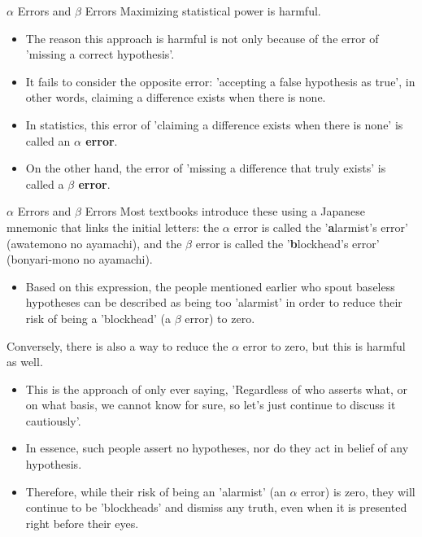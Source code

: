 \documentclass[dvipdfmx, autodetect-engine, aspectratio=169, 10.5pt]{beamer}
\begin{document}
\begin{frame}{$\alpha$ Errors and $\beta$ Errors}
	Maximizing statistical power is harmful.
	\begin{itemize}
		\item The reason this approach is harmful is not only because of the error of 'missing a correct hypothesis'.
		\item It fails to consider the opposite error: 'accepting a false hypothesis as true', in other words, claiming a difference exists when there is none.
		      \vspace{5mm}
		\item In statistics, this error of 'claiming a difference exists when there is none' is called an \textbf{$\alpha$ error}.
		      \vspace{5mm}
		\item On the other hand, the error of 'missing a difference that truly exists' is called a \textbf{$\beta$ error}.
	\end{itemize}
\end{frame}

\begin{frame}{$\alpha$ Errors and $\beta$ Errors}
	Most textbooks introduce these using a Japanese mnemonic that links the initial letters: the $\alpha$ error is called the '\textbf{a}larmist's error' (awatemono no ayamachi), and the $\beta$ error is called the '\textbf{b}lockhead's error' (bonyari-mono no ayamachi).
	\begin{itemize}
		\item Based on this expression, the people mentioned earlier who spout baseless hypotheses can be described as being too 'alarmist' in order to reduce their risk of being a 'blockhead' (a $\beta$ error) to zero.
	\end{itemize}
	Conversely, there is also a way to reduce the $\alpha$ error to zero, but this is harmful as well.
	\begin{itemize}
		\item This is the approach of only ever saying, 'Regardless of who asserts what, or on what basis, we cannot know for sure, so let's just continue to discuss it cautiously'.
		\item In essence, such people assert no hypotheses, nor do they act in belief of any hypothesis.
		\item Therefore, while their risk of being an 'alarmist' (an $\alpha$ error) is zero, they will continue to be 'blockheads' and dismiss any truth, even when it is presented right before their eyes.
	\end{itemize}
\end{frame}
\end{document}
